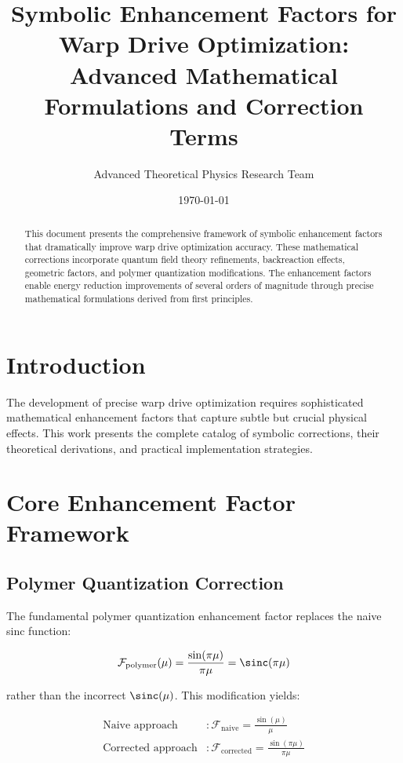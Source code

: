 \documentclass[12pt,a4paper]{article}
\title{Symbolic Enhancement Factors for Warp Drive Optimization:\\Advanced Mathematical Formulations and Correction Terms}
\author{Advanced Theoretical Physics Research Team}
\date{\today}
\begin{document}
\maketitle

\begin{abstract}
This document presents the comprehensive framework of symbolic enhancement factors that dramatically improve warp drive optimization accuracy. These mathematical corrections incorporate quantum field theory refinements, backreaction effects, geometric factors, and polymer quantization modifications. The enhancement factors enable energy reduction improvements of several orders of magnitude through precise mathematical formulations derived from first principles.
\end{abstract}

\section{Introduction}

The development of precise warp drive optimization requires sophisticated mathematical enhancement factors that capture subtle but crucial physical effects. This work presents the complete catalog of symbolic corrections, their theoretical derivations, and practical implementation strategies.

\section{Core Enhancement Factor Framework}

\subsection{Polymer Quantization Correction}

The fundamental polymer quantization enhancement factor replaces the naive sinc function:

\begin{equation}
\mathcal{F}_{\text{polymer}}(\mu) = \frac{\sin(\pi\mu)}{\pi\mu} = \sinc(\pi\mu)
\end{equation}

rather than the incorrect $\sinc(\mu)$. This modification yields:

\begin{align}
\text{Naive approach} &: \mathcal{F}_{\text{naive}} = \frac{\sin(\mu)}{\mu} \\
\text{Corrected approach} &: \mathcal{F}_{\text{corrected}} = \frac{\sin(\pi\mu)}{\pi\mu}
\end{align}
\end{document}
